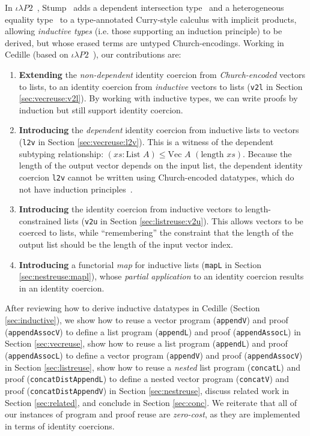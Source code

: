 \documentclass[a4paper,envcountsame,envcountsect]{llncs}
\newcommand{\refsec}[1]{Section \ref{sec:#1}}
\newcommand{\earg}[1]{\,\,#1}
\newcommand{\subtp}[0]{\leq}
\newcommand{\cdle}[0]{\ensuremath{\iota \lambda P2}~}
\newcommand{\name}[1]{\textrm{#1}}
\begin{document}
In \cdle, Stump~\cite{stump17b} adds a
dependent intersection type~\cite{kopylov03}
and a heterogeneous equality type~\cite{mcbride00}
to a type-annotated Curry-style calculus
with implicit products, allowing \textit{inductive types} (i.e. those
supporting an induction principle) to be derived,
but whose erased terms are untyped Church-encodings.
Working in Cedille (based on \cdle), our contributions are:
\begin{enumerate}
\item{\textbf{Extending}}
  the \textit{non-dependent} identity coercion from \textit{Church-encoded}
  vectors to lists, to an identity coercion from \textit{inductive}
  vectors to lists (\texttt{v2l} in \refsec{vecreuse:v2l}). By working
  with inductive types, we can write proofs by induction but still
  support identity coercion.
\item{\textbf{Introducing}}
  the \textit{dependent} identity coercion from inductive
  lists to vectors (\texttt{l2v} in \refsec{vecreuse:l2v}). This is a witness of the
  dependent subtyping relationship:
  $(xs : \name{List}  \earg A) \subtp \name{Vec} \earg A \earg (\name{length} \earg xs)$.
  Because the length of the output vector depends on the input list, the dependent
  identity coercion \texttt{l2v} cannot be written using Church-encoded
  datatypes, which do not have
  induction principles~\cite{geuvers01}.
\item{\textbf{Introducing}} the identity coercion from inductive
  vectors to length-{\linebreak}constrained lists (\texttt{v2u} in
  \refsec{listreuse:v2u}). This allows vectors to be coerced to lists,
  while ``remembering'' the constraint that the length of the output
  list should be the length of the input vector index.
\item{\textbf{Introducing}}
  a functorial \textit{map} for inductive lists
  (\texttt{mapL} in \refsec{nestreuse:mapl}), whose
  \textit{partial application} to an identity coercion results in an
  identity coercion.
\end{enumerate}

After reviewing how to derive inductive datatypes in Cedille
(\refsec{inductive}),
we show how to reuse a vector program
(\texttt{appendV}) and proof (\texttt{appendAssocV})
to define a list program (\texttt{appendL}) and proof
(\texttt{appendAssocL}) in \refsec{vecreuse},
show how to reuse a list program
(\texttt{appendL}) and proof (\texttt{appendAssocL})
to define a vector program (\texttt{appendV}) and proof
(\texttt{appendAssocV}) in \refsec{listreuse},
show how to reuse a \textit{nested} list program
(\texttt{concatL}) and proof (\texttt{concatDistAppendL})
to define a nested vector program (\texttt{concatV})
and proof (\texttt{concatDistAppendV})
in \refsec{nestreuse},
discuss related work in \refsec{related},
and conclude in \refsec{conc}.
We reiterate that all of our instances of program and proof reuse
are \textit{zero-cost}, as they are implemented in terms of
identity coercions.
\end{document}

